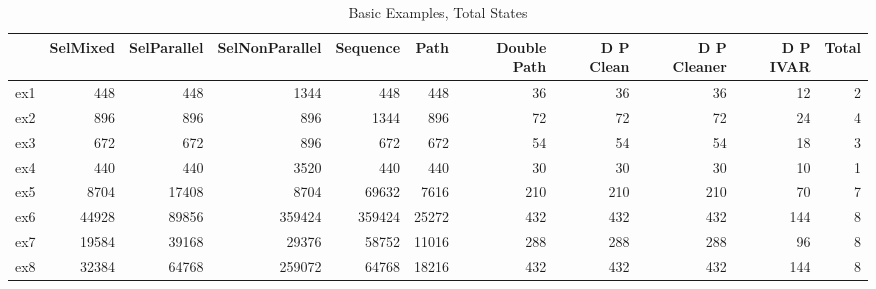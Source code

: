 \begin{table}
\centering
\caption{Basic Examples, Total States}
\label{b_e_total}
\begin{tabular}{lrrrrrrrrrr}
\toprule
{} &  SelMixed &  SelParallel &  SelNonParallel &  Sequence &   Path &  Double Path &  D P Clean &  D P Cleaner &  D P IVAR &  Total \\
\midrule
ex1 &       448 &          448 &            1344 &       448 &    448 &           36 &         36 &           36 &        12 &      2 \\
ex2 &       896 &          896 &             896 &      1344 &    896 &           72 &         72 &           72 &        24 &      4 \\
ex3 &       672 &          672 &             896 &       672 &    672 &           54 &         54 &           54 &        18 &      3 \\
ex4 &       440 &          440 &            3520 &       440 &    440 &           30 &         30 &           30 &        10 &      1 \\
ex5 &      8704 &        17408 &            8704 &     69632 &   7616 &          210 &        210 &          210 &        70 &      7 \\
ex6 &     44928 &        89856 &          359424 &    359424 &  25272 &          432 &        432 &          432 &       144 &      8 \\
ex7 &     19584 &        39168 &           29376 &     58752 &  11016 &          288 &        288 &          288 &        96 &      8 \\
ex8 &     32384 &        64768 &          259072 &     64768 &  18216 &          432 &        432 &          432 &       144 &      8 \\
\bottomrule
\end{tabular}
\end{table}
